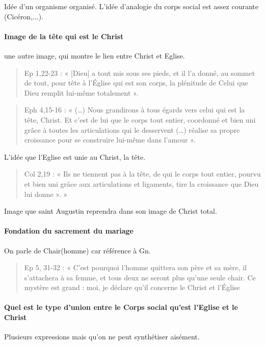  Idée d'un organisme organisé. 
 L'idée d'analogie du corps social est assez courante (Cicéron,...). 
 
 \paragraph{Image de la tête qui est le Christ} une autre image, qui montre le lien entre Christ et Eglise.
 
 \begin{quote}
     Ep 1,22-23 : « [Dieu] a tout mis sous ses pieds, et il l’a donné, au sommet de tout, pour tête à l’Église qui est son corps, la plénitude de Celui que Dieu remplit lui-même totalement ». 
 \end{quote}
 \begin{quote}
     Eph 4,15-16 : « (…) Nous grandirons à tous égards vers celui qui est la tête, Christ. Et c’est de lui que le corps tout entier, coordonné et bien uni grâce à toutes les articulations qui le desservent (…) réalise sa propre croissance pour se construire lui-même dans l’amour ». 
 \end{quote}
 L'idée que l'Eglise est unie au Christ, la tête.
 
 \begin{quote}
     Col 2,19 : « Ils ne tiennent pas à la tête, de qui le corps tout entier, pourvu et bien uni grâce aux articulations et ligaments, tire la croissance que Dieu lui donne ».  » 
 \end{quote}
 Image que saint Augustin reprendra dans son image de Christ total.
 
 \paragraph{Fondation du sacrement du mariage} On parle de Chair(homme) car référence à Gn. 
 
 \begin{quote}
     Ep 5, 31-32 : « C’est pourquoi l’homme quittera son père et sa mère, il s’attachera à sa femme, et tous deux ne seront plus qu’une seule chair. Ce mystère est grand : moi, je déclare qu’il concerne le Christ et l’Église
 \end{quote}
 
 \paragraph{Quel est le type d'union entre le Corps social qu'est l'Eglise et le Christ} Plusieurs expressions mais qu'on ne peut synthétiser aisément.
 
